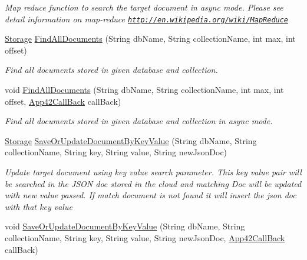 \begin{DoxyCompactItemize}
\begin{DoxyCompactList}\small\item\em Map reduce function to search the target document in async mode. Please see detail information on map-\/reduce \href{http://en.wikipedia.org/wiki/MapReduce}{\tt http\+://en.\+wikipedia.\+org/wiki/\+Map\+Reduce} \end{DoxyCompactList}\item 
\hyperlink{classcom_1_1shephertz_1_1app42_1_1paas_1_1sdk_1_1csharp_1_1storage_1_1_storage}{Storage} \hyperlink{classcom_1_1shephertz_1_1app42_1_1paas_1_1sdk_1_1csharp_1_1storage_1_1_storage_service_a5491c7e616793b443574689b0a7393b1}{Find\+All\+Documents} (String db\+Name, String collection\+Name, int max, int offset)
\begin{DoxyCompactList}\small\item\em Find all documents stored in given database and collection. \end{DoxyCompactList}\item 
void \hyperlink{classcom_1_1shephertz_1_1app42_1_1paas_1_1sdk_1_1csharp_1_1storage_1_1_storage_service_a1ac8b37b2cde5cc32adac2920a123a75}{Find\+All\+Documents} (String db\+Name, String collection\+Name, int max, int offset, \hyperlink{interfacecom_1_1shephertz_1_1app42_1_1paas_1_1sdk_1_1csharp_1_1_app42_call_back}{App42\+Call\+Back} call\+Back)
\begin{DoxyCompactList}\small\item\em Find all documents stored in given database and collection in async mode. \end{DoxyCompactList}\item 
\hyperlink{classcom_1_1shephertz_1_1app42_1_1paas_1_1sdk_1_1csharp_1_1storage_1_1_storage}{Storage} \hyperlink{classcom_1_1shephertz_1_1app42_1_1paas_1_1sdk_1_1csharp_1_1storage_1_1_storage_service_a49848135b3960c03cf9ab1a65f267e1f}{Save\+Or\+Update\+Document\+By\+Key\+Value} (String db\+Name, String collection\+Name, String key, String value, String new\+Json\+Doc)
\begin{DoxyCompactList}\small\item\em Update target document using key value search parameter. This key value pair will be searched in the J\+S\+O\+N doc stored in the cloud and matching Doc will be updated with new value passed. If match document is not found it will insert the json doc with that key value \end{DoxyCompactList}\item 
void \hyperlink{classcom_1_1shephertz_1_1app42_1_1paas_1_1sdk_1_1csharp_1_1storage_1_1_storage_service_ab161aee11909e49ef9508f44e5c453c6}{Save\+Or\+Update\+Document\+By\+Key\+Value} (String db\+Name, String collection\+Name, String key, String value, String new\+Json\+Doc, \hyperlink{interfacecom_1_1shephertz_1_1app42_1_1paas_1_1sdk_1_1csharp_1_1_app42_call_back}{App42\+Call\+Back} call\+Back)

\end{DoxyCompactItemize}
